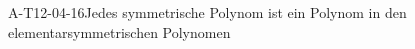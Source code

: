 
\begin{PROP}{A-T12-04-16}{Jedes symmetrische Polynom ist ein Polynom in den elementarsymmetrischen Polynomen}
\end{PROP}
